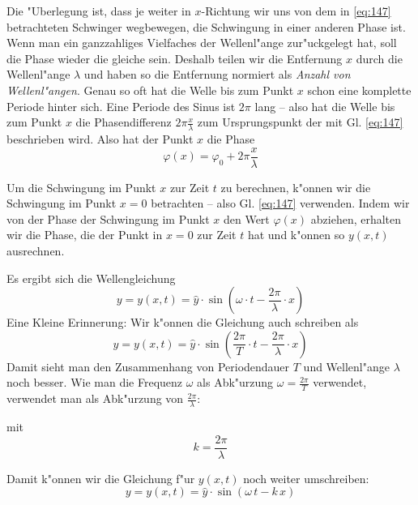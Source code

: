 

Die "Uberlegung ist, dass je weiter in $x$-Richtung wir uns von dem in
\eqref{eq:147} betrachteten Schwinger wegbewegen, die Schwingung in
einer anderen Phase ist. Wenn man ein ganzzahliges Vielfaches der
Wellenl"ange zur"uckgelegt hat, soll die Phase wieder die gleiche
sein. Deshalb teilen wir die Entfernung $x$ durch die Wellenl"ange
$\lambda$ und haben so die Entfernung normiert als \emph{Anzahl von
  Wellenl"angen}. Genau so oft hat die Welle bis zum Punkt $x$ schon
eine komplette Periode hinter sich. Eine Periode des Sinus ist $2\pi$
lang -- also hat die Welle bis zum Punkt $x$ die Phasendifferenz
$2\pi\frac{x}{\lambda}$ zum Ursprungspunkt der mit Gl.  \eqref{eq:147}
beschrieben wird. Also hat der Punkt $x$ die Phase
$$
\varphi(x) =
\varphi_0 + 2\pi\frac{x}{\lambda}
$$


Um die Schwingung im Punkt $x$ zur Zeit $t$ zu berechnen, k"onnen wir
die Schwingung im Punkt $x = 0$ betrachten -- also Gl. \eqref{eq:147}
verwenden. %
Indem wir von der Phase der Schwingung im Punkt $x$ den Wert
$\varphi(x)$ abziehen, erhalten wir die Phase, die der Punkt in $x=0$
zur Zeit $t$ hat und k"onnen so $y(x,t)$ ausrechnen.

Es ergibt sich die Wellengleichung
\begin{equation*}
y = y(x,t) = \hat y \cdot \sin \left ( \omega \cdot t - \frac{2\pi}{\lambda}
   \cdot x \right ) 
\end{equation*}
Eine Kleine Erinnerung: Wir k"onnen die Gleichung auch schreiben als
\begin{equation*}
   y = y(x,t) = \hat y \cdot \sin \left ( \frac{2\pi}{T} \cdot t - \frac{2\pi}{\lambda}
   \cdot x \right )
\end{equation*}
Damit sieht man den Zusammenhang von Periodendauer $T$ und Wellenl"ange
$\lambda$ noch besser. Wie man die Frequenz $\omega$ als Abk"urzung
$\omega = \frac{2\pi}{T}$ verwendet, verwendet man als Abk"urzung von $\frac{2\pi}{\lambda}$:
\begin{Def}
    mit 
   \begin{equation}
      \label{eq:205}
      k = \frac{2\pi}{\lambda}
   \end{equation}
\end{Def}
Damit k"onnen wir die Gleichung f"ur $y(x,t)$ noch weiter umschreiben:
\begin{equation}
   \label{eqn_welle_1dim}
   \boxed{
y = y(x,t) = \hat y \cdot \sin \left ( \omega \, t - k \, x \right ) }
\end{equation}

